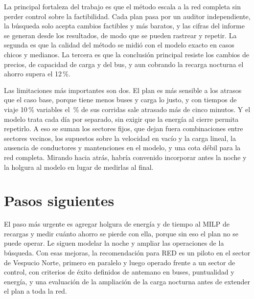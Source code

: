 La principal fortaleza del trabajo es que el método escala a la red completa sin perder control sobre la factibilidad. Cada plan pasa por un auditor independiente, la búsqueda solo acepta cambios factibles y más baratos, y las cifras del informe se generan desde los resultados, de modo que se pueden rastrear y repetir. La segunda es que la calidad del método se midió con el modelo exacto en casos chicos y medianos. La tercera es que la conclusión principal resiste los cambios de precios, de capacidad de carga y del bus, y aun cobrando la recarga nocturna el ahorro supera el 12\,\%.

Las limitaciones más importantes son dos. El plan es más sensible a los atrasos que el caso base, porque tiene menos buses y carga lo justo, y con tiempos de viaje 10\,\% variables el \AtrasadasPlanDiez\,\% de sus corridas sale atrasado más de cinco minutos. Y el modelo trata cada día por separado, sin exigir que la energía al cierre permita repetirlo. A eso se suman los sectores fijos, que dejan fuera combinaciones entre sectores vecinos, los supuestos sobre la velocidad en vacío y la carga lineal, la ausencia de conductores y mantenciones en el modelo, y una cota débil para la red completa. Mirando hacia atrás, habría convenido incorporar antes la noche y la holgura al modelo en lugar de medirlas al final.

\section{Pasos siguientes}
\label{sec:pasos}

El paso más urgente es agregar holgura de energía y de tiempo al MILP de recargas y medir cuánto ahorro se pierde con ella, porque sin eso el plan no se puede operar. Le siguen modelar la noche y ampliar las operaciones de la búsqueda. Con esas mejoras, la recomendación para RED es un piloto en el sector de Vespucio Norte, primero en paralelo y luego operado frente a un sector de control, con criterios de éxito definidos de antemano en buses, puntualidad y energía, y una evaluación de la ampliación de la carga nocturna antes de extender el plan a toda la red.
